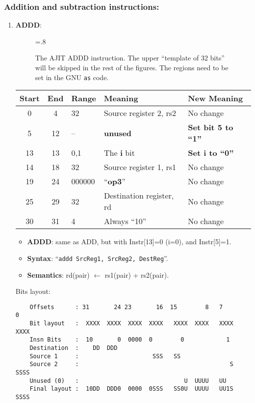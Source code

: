 \subsubsection{Addition and subtraction instructions:}
\label{sec:add:sub:insn:impl}
\begin{enumerate}
\item \textbf{ADDD}:\\
  \begin{center}
    \begin{figure}[h]
      \centering
      \epsfxsize=.8\linewidth
      \caption{The AJIT ADDD instruction.   The upper ``template of 32
        bits''  will be  skipped  in  the rest  of  the figures.   The
        {}  regions need  to be set  in the
        GNU \texttt{as} code.}
      \label{fig:ajit:addd:insn}
    \end{figure}
    \begin{tabular}[p]{|c|c|l|l|l|}
      \hline
      \textbf{Start} & \textbf{End} & \textbf{Range} & \textbf{Meaning} &
                                                                          \textbf{New Meaning}\\
      \hline
      0 & 4 & 32 & Source register 2, rs2 & No change \\
      5 & 12 & -- & \textbf{unused} & \textbf{Set bit 5 to ``1''} \\
      13 & 13 & 0,1 & The \textbf{i} bit & \textbf{Set i to ``0''} \\
      14 & 18 & 32 & Source register 1, rs1 & No change \\
      19 & 24 & 000000 & ``\textbf{op3}'' & No change \\
      25 & 29 & 32 & Destination register, rd & No change \\
      30 & 31 & 4 & Always ``10'' & No change \\
      \hline
    \end{tabular}
  \end{center}
  \begin{itemize}
  \item []\textbf{ADDD}: same as ADD, but with Instr[13]=0 (i=0), and
    Instr[5]=1.
  \item []\textbf{Syntax}: ``\texttt{addd  SrcReg1, SrcReg2, DestReg}''.
  \item []\textbf{Semantics}: rd(pair) $\leftarrow$ rs1(pair) + rs2(pair).
  \end{itemize}
  Bits layout:
\begin{verbatim}
    Offsets      : 31       24 23       16  15        8   7        0
    Bit layout   :  XXXX  XXXX  XXXX  XXXX   XXXX  XXXX   XXXX  XXXX
    Insn Bits    :  10       0  0000  0        0            1       
    Destination  :    DD  DDD                                       
    Source 1     :                     SSS   SS
    Source 2     :                                           S  SSSS
    Unused (0)   :                              U  UUUU   UU        
    Final layout :  10DD  DDD0  0000  0SSS   SS0U  UUUU   UU1S  SSSS
\end{verbatim}


\end{enumerate}
